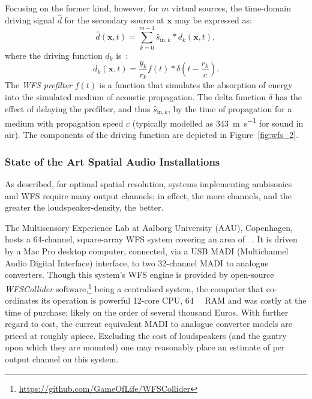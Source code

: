 \documentclass[utf8]{FrontiersinHarvard}
\newcommand{\figref}[1]{Figure~\ref{#1}}
\newcommand{\bfx}{\mathbf{x}}
\newcommand{\sigink}{\hat{s}_{\text{in},k}}
\begin{document}
    Focusing on the former kind, however, for $m$ virtual sources, the time-domain
    driving signal $\hat{d}$ for the secondary source at $\bfx$ may be expressed
    as:
    \begin{equation}
        \label{eq:driving-signal}
        \hat{d}(\bfx,t) = \sum_{k=0}^{m-1}\sigink \ast d_k(\bfx,t),
    \end{equation}
    where the driving function $d_k$ is~\citep{ahrens_analytic_2012}:
    \begin{equation}
        \label{eq:driving-function}
        d_k(\bfx,t) = \frac{y_k}{r_k}f(t) \ast \delta\left(t - \frac{r_k}{c}\right).
    \end{equation}
    The \textit{WFS prefilter} $f(t)$ is a function that simulates the absorption of
    energy into the simulated medium of acoustic propagation.
    The delta function $\delta$ has the effect of delaying the prefilter, and thus
    $\sigink$, by the time of propagation for a medium with propagation speed $c$
    (typically modelled as \qty[per-mode=symbol]{343}{\m\per\s} for sound in air).
    The components of the driving function are depicted in \figref{fig:wfs_2}.

    \subsubsection{State of the Art Spatial Audio Installations}
    \label{subsubsec:spatial-sota}

    As described, for optimal spatial resolution, systems implementing ambisonics
    and WFS require many output channels; in effect, the more channels, and the
    greater the loudspeaker-density, the better.

    The Multisensory Experience Lab at Aalborg University (AAU), Copenhagen, hosts
    a 64-channel, square-array WFS system covering an area of
    ~\citep{grani_gestural_2016}.
    It is driven by a Mac Pro desktop computer, connected, via a USB MADI
    (Multichannel Audio Digital Interface) interface, to two 32-channel MADI to
    analogue converters.
    Though this system's WFS engine is provided by open-source \textit{WFSCollider}
    software,\footnote{\url{https://github.com/GameOfLife/WFSCollider}} being a
    centralised system, the computer that co-ordinates its operation is powerful
    \textemdash{} 12-core CPU, \qty{64}{\giga\byte} RAM \textemdash{} and was costly
    at the time of purchase; likely on the order of several thousand Euros.
    With further regard to cost, the current equivalent MADI to analogue converter
    models are priced at roughly  apiece.
    Excluding the cost of loudspeakers (and the gantry upon which they are mounted)
    one may reasonably place an estimate of  per output channel on
    this system.
\end{document}
